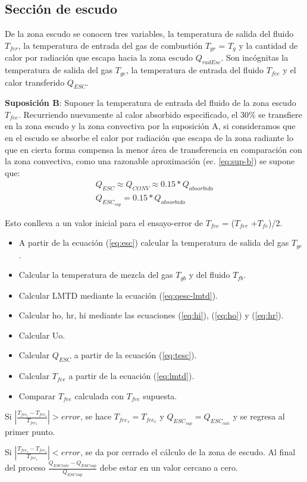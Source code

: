 \subsection{Sección de escudo}
\par De la zona escudo se conocen tres variables, la temperatura de salida del fluido $T_{fer}$, la temperatura de entrada del gas de combustión $T_{gr}$ = $T_g$ y la cantidad de calor por radiación que escapa hacia la zona escudo $Q_{radEsc}$. Son incógnitas la temperatura de salida del gas $T_{ge}$, la temperatura de entrada del fluido $T_{fee}$ y el calor transferido $Q_{ESC}$.
\par \textbf{Suposición B}: Suponer la temperatura de entrada del fluido de la zona escudo $T_{fee}$. Recurriendo nuevamente al calor absorbido especificado, el 30\% se transfiere en la zona escudo y la zona convectiva por la suposición A, si consideramos que en el escudo se absorbe el calor por radiación que escapa de la zona radiante lo que en cierta forma compensa la menor área de transferencia en comparación con la zona convectiva, como una razonable aproximación (ec. \ref{eq:sup-b}) se supone que:
\begin{equation} \label{eq:sup-b} \begin{gathered}
    Q_{ESC} \approx Q_{CONV} \approx 0.15 * Q_{absorbido}\\
    Q_{ESC_{sup}} = 0.15 * Q_{absorbido} 
\end{gathered} \end{equation}
\par Esto conlleva a un valor inicial para el ensayo-error de $T_{fee}$ = ($T_{fer}$ +$T_{fe}$)/2. 

\begin{itemize}
\item A partir de la ecuación (\ref{eq:esc}) calcular la temperatura de salida del gas $T_{ge}$.
\item Calcular la temperatura de mezcla del gas $T_{gb}$ y del fluido $T_{fb}$.
\item Calcular LMTD mediante la ecuación (\ref{eq:qesc-lmtd}).
\item Calcular ho, hr, hi mediante las ecuaciones (\ref{eq:hi}), (\ref{eq:ho}) y (\ref{eq:hr}).
\item Calcular Uo.
\item Calcular $Q_{ESC}$ a partir de la ecuación (\ref{eq:tesc}).
\item Calcular $T_{fee}$ a partir de la ecuación (\ref{eq:lmtd}).
\item Comparar $T_{fee}$ calculada con $T_{fee}$ supuesta.
\end{itemize}
\par Si $|\frac{T_{fee_c} - T_{fee_s}}{T_{fee_s}}| > error$, se hace $T_{fee_s} = T_{fee_c}$ y $Q_{ESC_{sup}} = Q_{ESC_{calc}}$ y se regresa al primer punto.
\par Si $|\frac{T_{fee_c} - T_{fee_s}}{T_{fee_s}} | < error$, se da por cerrado el cálculo de la zona de escudo. Al final del proceso $\frac{Q_{ESCcalc} - Q_{ESCsup}}{ Q_{ESCsup}}$ debe estar en un valor cercano a cero.

